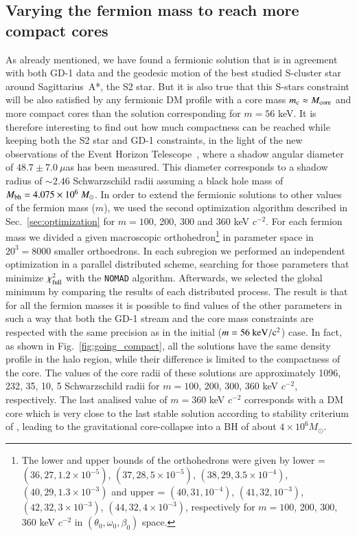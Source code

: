 \documentclass[twocolumn]{aa}
\begin{document}
\subsection{Varying the fermion mass to reach more compact cores}
As already mentioned, we have found a fermionic solution that is in agreement with both GD-1 data and
the geodesic motion of the best studied S-cluster star around Sagittarius~A*, the S2 star. But it is also true that this S-stars constraint will be also satisfied by any fermionic DM profile
with a core mass $m_\mathrm{c}\approx M_{\rm{core}}$ and more compact cores than the solution corresponding for $m=56$ keV. It is therefore interesting to find out how much compactness can be reached
while keeping both the S2 star and \hbox{GD-1} constraints, in the light of the new observations
of the Event Horizon Telescope~\citep{EHT_image}, where a shadow angular diameter of $48.7\pm7.0~\mu$as
has been measured. This diameter corresponds to a shadow radius of $\sim 2.46$ Schwarzschild radii assuming
a black hole mass of $M_{\rm{bh}}=4.075\times10^6~M_\odot$.
In order to extend the fermionic solutions to other values of the fermion mass ($m$), we used the second optimization algorithm described in Sec.~\ref{sec:optimization} for $m=100$, 200, 300 and 360 keV $c^{-2}$. For each fermion mass we divided a given macroscopic orthohedron\footnote{The lower and upper bounds of the orthohedrons were given by
lower = $(36, 27, 1.2\times10^{-5})$, $(37, 28, 5\times10^{-5})$, $(38, 29, 3.5\times10^{-4})$, $(40, 29, 1.3\times10^{-3})$ and
upper = $(40, 31, 10^{-4})$, $(41, 32, 10^{-3})$, $(42, 32, 3\times10^{-3})$, $(44, 32, 4\times10^{-3})$, respectively for $m=100$, 200, 300, 360 keV $c^{-2}$ in $(\theta_0, \omega_0, \beta_0)$ space.}
in parameter space in $20^3=8000$ smaller orthoedrons. In each subregion we performed an independent optimization in a parallel distributed scheme, searching for those parameters that minimize $\chi^2_{\rm{full}}$ with the \texttt{NOMAD} algorithm. Afterwards, we selected the global minimum by comparing the results of each distributed process.
The result is that for all the fermion masses it is possible to find values of the other parameters in such a way that both the GD-1 stream and the core mass constraints  are respected with the same precision as in the initial ($m=56~\rm{keV}/c^2$) case. In fact, as shown in Fig.~\ref{fig:going_compact}, all the solutions have the same density profile in the halo region, while their difference is limited to the compactness of the core.
The values of the core radii of these solutions are approximately 1096, 232, 35, 10, 5 Schwarzschild radii for $m=100$, 200, 300, 360 keV $c^{-2}$, respectively. The last analised value of $m=360$ keV $c^{-2}$ corresponds with a DM core which is very close to the last stable solution according to stability criterium of \cite{2021MNRAS.502.4227A}, leading to the gravitational core-collapse into a BH of about $4\times 10^6 M_\odot$.
\end{document}
